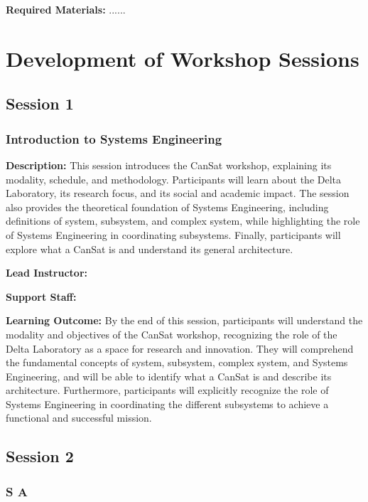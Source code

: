 \documentclass[a4paper,12pt]{article}
\begin{document}
\textbf{Required Materials:} ......

\newpage

\section{Development of Workshop Sessions}

\subsection{Session 1}

\subsubsection{Introduction to Systems Engineering}

\textbf{Description:} This session introduces the CanSat workshop, explaining its modality, schedule, and methodology. Participants will learn about the Delta Laboratory, its research focus, and its social and academic impact. The session also provides the theoretical foundation of Systems Engineering, including definitions of system, subsystem, and complex system, while highlighting the role of Systems Engineering in coordinating subsystems. Finally, participants will explore what a CanSat is and understand its general architecture.

\textbf{Lead Instructor:} 

\textbf{Support Staff: }

\textbf{Learning Outcome:} By the end of this session, participants will understand the modality and objectives of the CanSat workshop, recognizing the role of the Delta Laboratory as a space for research and innovation. They will comprehend the fundamental concepts of system, subsystem, complex system, and Systems Engineering, and will be able to identify what a CanSat is and describe its architecture. Furthermore, participants will explicitly recognize the role of Systems Engineering in coordinating the different subsystems to achieve a functional and successful mission.





\newpage

\subsection{Session 2}
\subsubsection{S A}
\end{document}
